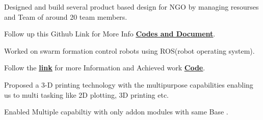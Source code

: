 \documentclass[]{font}
\begin{document}
\begin{minipage}[t]{0.69\textwidth}
\begin{tightemize}
\item Designed and build several product based design for NGO by managing resourses and Team of around 20 team members.
\item Follow up this Github Link for More Info \textbf{\href{https://github.com/pranav083/Tinkering_project}{\underline{Codes and Document}}}.	
\end{tightemize}
\sectionsep


\begin{tightemize}
\item Worked on swarm formation control robots using ROS(robot operating system).
\item Follow the \textbf{\href{http://crip.ml}{\underline{link}}} for more  Information and Achieved work \textbf{\href{https://github.com/pranav083/ROS_work_earlier_nrf}{\underline{Code}}}.	
\end{tightemize}
\sectionsep

\begin{tightemize}
\item Proposed a 3-D printing technology with the multipurpose
capabilities enabling us to multi tasking like 2D plotting, 3D printing etc.
\item Enabled Multiple capabiltiy with only addon modules with same Base .
\end{tightemize}
\sectionsep



\end{minipage}
\end{document}
